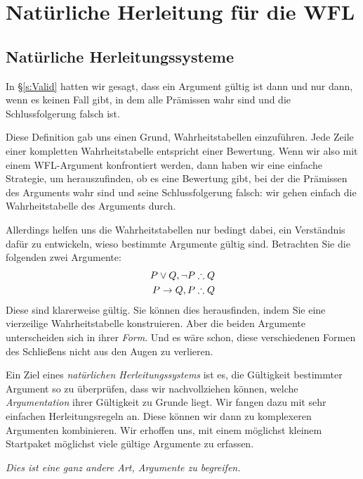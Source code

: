 \part{Natürliche Herleitung für die WFL}
\label{ch.NDTFL}

\chapter{Natürliche Herleitungssysteme}\label{s:NDVeryIdea}

In \S\ref{s:Valid} hatten wir gesagt, dass ein Argument gültig ist dann und nur dann, wenn es keinen Fall gibt, in dem alle Prämissen wahr sind und die Schlussfolgerung falsch ist. 

Diese Definition gab uns einen Grund, Wahrheitstabellen einzuführen. Jede Zeile einer kompletten Wahrheitstabelle entspricht einer Bewertung. Wenn wir also mit einem WFL-Argument konfrontiert werden, dann haben wir eine einfache Strategie, um herauszufinden, ob es eine Bewertung gibt, bei der die Prämissen des Arguments wahr sind und seine Schlussfolgerung falsch: wir gehen einfach die Wahrheitstabelle des Arguments durch.

Allerdings helfen uns die Wahrheitstabellen nur bedingt dabei, ein Verständnis dafür zu entwickeln, wieso bestimmte Argumente gültig sind. Betrachten Sie die folgenden zwei Argumente:
\begin{align*}
P \eor Q, \enot P & \therefore Q\\
P \eif Q, P & \therefore Q
\end{align*}
Diese sind klarerweise gültig. Sie können dies herausfinden, indem Sie eine vierzeilige Wahrheitstabelle konstruieren. Aber die beiden Argumente unterscheiden sich in ihrer \emph{Form}. Und es wäre schon, diese verschiedenen Formen des Schlie{\ss}ens nicht aus den Augen zu verlieren.

Ein Ziel eines \emph{natürlichen Herleitungssystems} ist es, die Gültigkeit bestimmter Argument so zu überprüfen, dass wir nachvollziehen können, welche \emph{Argumentation} ihrer Gültigkeit zu Grunde liegt. Wir fangen dazu mit sehr einfachen Herleitungsregeln an. Diese können wir dann zu komplexeren Argumenten kombinieren. Wir erhoffen uns, mit einem möglichst kleinem Startpaket möglichst viele gültige Argumente zu erfassen. 

\emph{Dies ist eine ganz andere Art, Argumente zu begreifen.} 

